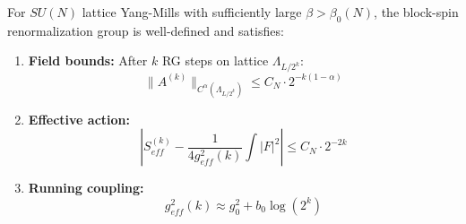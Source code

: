 \begin{theorem}
\label{thm:balaban_uv}
For $SU(N)$ lattice Yang-Mills with sufficiently large $\beta > \beta_0(N)$, the block-spin renormalization group is well-defined and satisfies:
\begin{enumerate}
\item \textbf{Field bounds:} After $k$ RG steps on lattice $\Lambda_{L/2^k}$:
\begin{equation}
\|A^{(k)}\|_{C^\alpha(\Lambda_{L/2^k})} \leq C_N \cdot 2^{-k(1-\alpha)}
\end{equation}

\item \textbf{Effective action:}
\begin{equation}
\left| S_{eff}^{(k)} - \frac{1}{4g_{eff}^2(k)} \int |F|^2 \right| \leq C_N \cdot 2^{-2k}
\end{equation}

\item \textbf{Running coupling:}
\begin{equation}
g_{eff}^2(k) \approx g_0^2 + b_0 \log(2^k)
\end{equation}
\end{enumerate}
\end{theorem}

